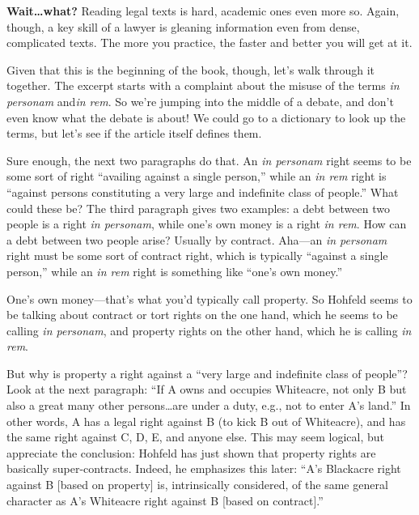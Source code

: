 
\item \textbf{Wait\ldots what?} Reading legal texts is hard, academic ones even
more so. Again, though, a key skill of a lawyer is gleaning information even
from dense, complicated texts. The more you practice, the faster and better you
will get at it.

Given that this is the beginning of the book, though, let's walk through it
together. The excerpt starts with a complaint about the
misuse of the terms \emph{in personam} and\emph{in rem}. So we're jumping into
the middle of a debate, and don't even know what the debate is about! We could
go to a dictionary to look up the terms, but let's see if the article itself
defines them.

Sure enough, the next two paragraphs do that. An \emph{in personam} right seems
to be some sort of right ``availing against a single person,'' while an \emph{in
rem} right is ``against persons constituting a very large and indefinite class
of people.'' What could these be? The third paragraph gives two examples: a debt
between two people is a right \emph{in personam}, while one's own money is a
right \emph{in rem}. How can a debt between two people arise? Usually by
contract. Aha---an \emph{in personam} right must be some sort of contract right,
which is typically ``against a single person,'' while an \emph{in rem} right is
something like ``one's own money.''

One's own money---that's what you'd typically call property. So Hohfeld seems to
be talking about contract or tort rights on the one hand, which he seems to be
calling \emph{in personam}, and property rights on the other hand, which he is
calling \emph{in rem}.

\item \label{hohfeld-right}
But why is property a right against a ``very large and indefinite
class of people''? Look at the next paragraph: ``If A owns and occupies
Whiteacre, not only B but also a great many other persons\ldots are under a
duty, e.g., not to enter A's land.'' In other words, A has a legal right against
B (to kick B out of Whiteacre), and has the same right against C, D, E, and
anyone else. This may seem logical, but appreciate the conclusion: Hohfeld has
just shown that property rights are basically super-contracts. Indeed, he
emphasizes this later: ``A's Blackacre right against B [based on property] is,
intrinsically considered, of the same general character as A's Whiteacre right
against B [based on contract].''

